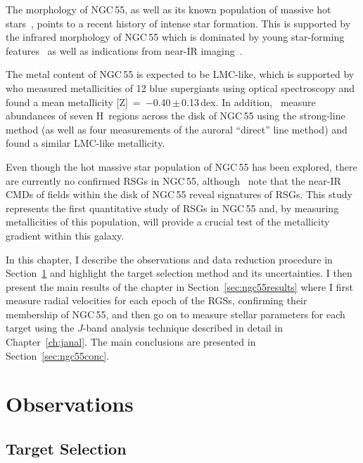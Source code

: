 The morphology of NGC\,55, as well as its known population of massive hot stars~\citep{2008A&A...485...41C,2012A&A...542A..79C}, points to a recent history of intense star formation.
This is supported by the infrared morphology of NGC\,55 which is dominated by young star-forming features~\citep[][with a star-formation rate of 0.22\,M$_{\odot}$yr$^{-1}$]{2004ApJS..154..248E} as well as indications from near-IR imaging~\citep{2005ApJ...622..279D}.

The metal content of NGC\,55 is expected to be LMC-like, which is supported by~\cite{2012A&A...542A..79C} who measured metallicities of 12 blue supergiants using optical spectroscopy and found a mean metallicity [Z]~=~$-$0.40\,$\pm$\,0.13\,dex.
In addition,~\cite{1983MNRAS.204..743W} measure abundances of seven H\,\2 regions across the disk of NGC\,55 using the strong-line method (as well as four measurements of the auroral ``direct'' line method) and found a similar LMC-like metallicity.

Even though the hot massive star population of NGC\,55 has been explored,
there are currently no confirmed RSGs in NGC\,55, although~\cite{2005ApJ...622..279D} note that the near-IR CMDs of fields within the disk of NGC\,55 reveal signatures of RSGs.
This study represents the first quantitative study of RSGs in NGC\,55 and, by measuring metallicities of this population, will provide a crucial test of the metallicity gradient within this galaxy.

In this chapter, I describe the observations and data reduction procedure in Section~\ref{sec:ngc55obs} and highlight the target selection method and its uncertainties.
I then present the main results of the chapter in Section~\ref{sec:ngc55results} where I first measure radial velocities for each epoch of the RGSs, confirming their membership of NGC\,55, and then go on to measure stellar parameters for each target using the $J$-band analysis technique described in detail in Chapter~\ref{ch:janal}.
The main conclusions are presented in Section~\ref{sec:ngc55conc}.


\section{Observations} %
\label{sec:ngc55obs}

\subsection{Target Selection} %
\label{sub:target_selection}

